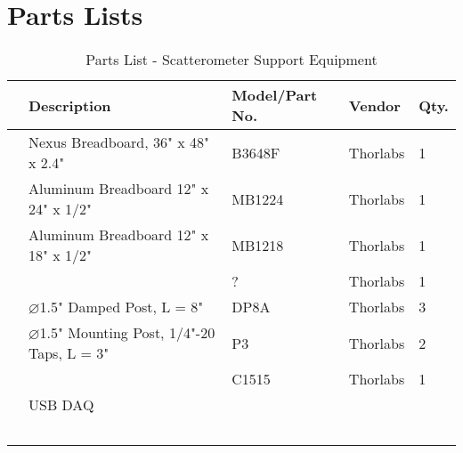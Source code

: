 \section{Parts Lists} \label{appx:parts_lists}

\begin{table}[htbp]
    \renewcommand{\arraystretch}{1.25}
    \caption{Parts List - Scatterometer Support Equipment}
    \begin{center}
        \begin{tabular}{ l l l l l }
        \toprule[2pt]
        \textbf{} & \textbf{Description} & \textbf{Model/Part No.}  & \textbf{Vendor} & \textbf{Qty.} \\
        \midrule[0.75pt]
        & Nexus Breadboard, 36" x 48" x 2.4" & B3648F & Thorlabs & 1 \\
        & Aluminum Breadboard 12" x 24" x 1/2" & MB1224 & Thorlabs & 1 \\
        & Aluminum Breadboard 12" x 18" x 1/2" & MB1218 & Thorlabs & 1 \\
        &  & ? & Thorlabs & 1 \\    %
        & $\diameter$1.5" Damped Post, L = 8" & DP8A & Thorlabs & 3 \\
        & $\diameter$1.5" Mounting Post, 1/4"-20 Taps, L = 3" & P3 & Thorlabs & 2 \\
        &  & C1515 & Thorlabs & 1 \\
        & USB DAQ &  &  &  \\
        &  &  &  &  \\
        &  &  &  &  \\
        &  &  &  &  \\
        &  &  &  &  \\
        &  &  &  &  \\
        \bottomrule[2pt]
        \end{tabular}
        \label{tab:parts_list_support}
    \end{center}
\end{table}


